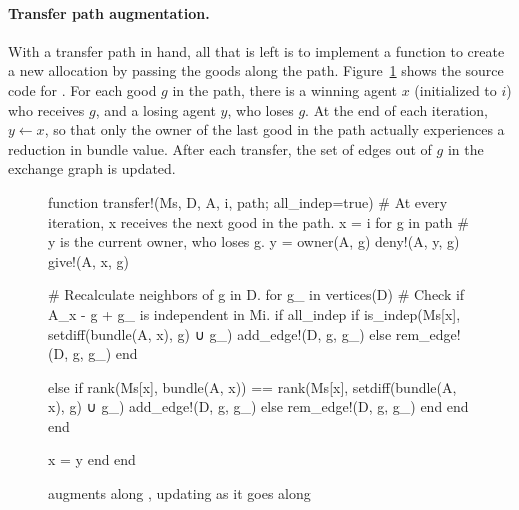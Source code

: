 \paragraph{Transfer path augmentation.} With a transfer path in hand, all that is left is to implement a function to create a new allocation by passing the goods along the path. Figure~\ref{code:transfer} shows the source code for . For each good $g$ in the path, there is a winning agent $x$ (initialized to $i$) who receives $g$, and a losing agent $y$, who loses $g$. At the end of each iteration, $y \leftarrow x$, so that only the owner of the last good in the path actually experiences a reduction in bundle value. After each transfer, the set of edges out of $g$ in the exchange graph is updated.

\begin{figure}
\begin{jllisting}

  function transfer!(Ms, D, A, i, path; all_indep=true)
  # At every iteration, x receives the next good in the path.
  x = i
  for g in path
    # y is the current owner, who loses g.
    y = owner(A, g)
    deny!(A, y, g)
    give!(A, x, g)

    # Recalculate neighbors of g in D.
    for g_ in vertices(D)
      # Check if A_x - g + g_ is independent in Mi.
      if all_indep
        if is_indep(Ms[x], setdiff(bundle(A, x), g) ∪ g_)
          add_edge!(D, g, g_)
        else
          rem_edge!(D, g, g_)
        end
        
      else
        if rank(Ms[x], bundle(A, x)) == rank(Ms[x], setdiff(bundle(A, x), g) ∪ g_)
          add_edge!(D, g, g_)
        else
          rem_edge!(D, g, g_)
        end
      end
    end

    x = y
  end
end

\end{jllisting}
\caption{ augments  along , updating  as it goes along}
\label{code:transfer}
\end{figure}